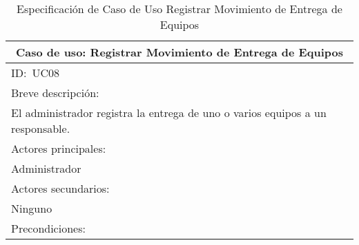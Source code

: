 \documentclass[stu, 12pt, letterpaper, donotrepeattitle, floatsintext, natbib]{apa7}
\begin{document}
\begin{longtable}{@{} p{16.5cm} @{}}
    \caption{Especificaci\'on de Caso de Uso Registrar Movimiento de Entrega de Equipos}\label{tab:UC08}                                                                                                                     \\ \toprule
    \multicolumn{1}{c}{Caso de uso: Registrar Movimiento de Entrega de Equipos}                                                                                                                                              \\ \midrule
    ID:~UC08                                                                                                                                                                                                                 \\ \midrule
    Breve descripci\'on:                                                                                                                                                                                                     \\
    El administrador registra la entrega de uno o varios equipos a un responsable.                                                                                                                                           \\ \midrule
    Actores principales:                                                                                                                                                                                                     \\
    Administrador                                                                                                                                                                                                            \\ \midrule
    Actores secundarios:                                                                                                                                                                                                     \\
    Ninguno                                                                                                                                                                                                                  \\ \midrule
    Precondiciones:                                                                                                                                                                                                          \\

\end{longtable}
\end{document}

